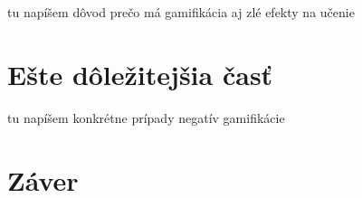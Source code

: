 \documentclass[10pt,twoside,slovak,a4paper]{article}
\begin{document}
tu napíšem dôvod prečo má gamifikácia aj zlé efekty na učenie


\section{Ešte dôležitejšia časť} \label{negativa}

tu napíšem konkrétne prípady negatív gamifikácie


\section{Záver} \label{zaver} %






\end{document}
